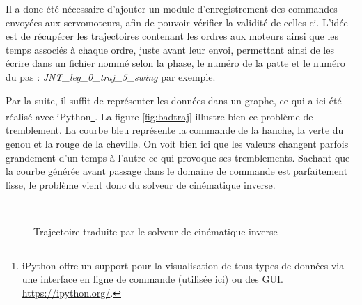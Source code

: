 \documentclass{tnreport}
\begin{document}
Il a donc été nécessaire d'ajouter un module d'enregistrement des commandes envoyées aux servomoteurs, afin de pouvoir vérifier la validité de celles-ci. L'idée est de récupérer les trajectoires contenant les ordres aux moteurs ainsi que les temps associés à chaque ordre, juste avant leur envoi, permettant ainsi de les écrire dans un fichier nommé selon la phase, le numéro de la patte et le numéro du pas : \textit{JNT\_leg\_0\_traj\_5\_swing} par exemple.

Par la suite, il suffit de représenter les données dans un graphe, ce qui a ici été réalisé avec iPython\footnote{iPython offre un support pour la visualisation de tous types de données via une interface en ligne de commande (utilisée ici) ou des GUI. \url{https://ipython.org/}.}. La figure \ref{fig:badtraj} illustre bien ce problème de tremblement. La courbe bleu représente la commande de la hanche, la verte du genou et la rouge de la cheville. On voit bien ici que les valeurs changent parfois grandement d'un temps à l'autre ce qui provoque ses tremblements. Sachant que la courbe générée avant passage dans le domaine de commande est parfaitement lisse, le problème vient donc du solveur de cinématique inverse.

\begin{figure}[h]
\centering
{}\qquad
{}\\
\caption{Trajectoire traduite par le solveur de cinématique inverse}
\end{figure}
\end{document}
